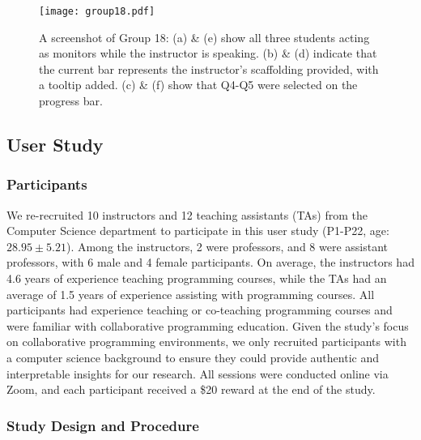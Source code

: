 \begin{figure*}
    \centering
    \texttt{[image: group18.pdf]}
    \caption{A screenshot of Group 18: (a) \& (e) show all three students acting as monitors while the instructor is speaking. (b) \& (d) indicate that the current bar represents the instructor's scaffolding provided, with a tooltip added. (c) \& (f) show that Q4-Q5 were selected on the progress bar.}
    \label{fig:group18}
\end{figure*}
\subsection{User Study}
\subsubsection{Participants}

We re-recruited 10 instructors and 12 teaching assistants (TAs) from the Computer Science department to participate in this user study (P1-P22, age: $ 28.95 \pm 5.21 $). Among the instructors, 2 were professors, and 8 were assistant professors, with 6 male and 4 female participants. On average, the instructors had 4.6 years of experience teaching programming courses, while the TAs had an average of 1.5 years of experience assisting with programming courses. All participants had experience teaching or co-teaching programming courses and were familiar with collaborative programming education. 
Given the study's focus on collaborative programming environments, we only recruited participants with a computer science background to ensure they could provide authentic and interpretable insights for our research. All sessions were conducted online via Zoom, and each participant received a \$20 reward at the end of the study.

\subsubsection{Study Design and Procedure}


